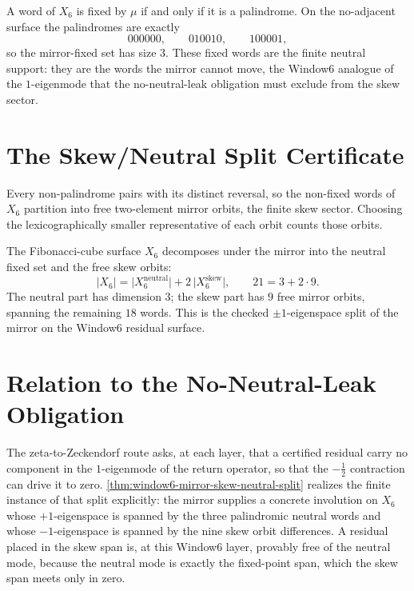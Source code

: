 \begin{theorem}
\label{thm:window6-mirror-fixed-palindrome}
A word of $X_6$ is fixed by $\mu$ if and only if it is a palindrome. On the no-adjacent surface the palindromes are exactly
$$
000000,\qquad 010010,\qquad 100001,
$$
so the mirror-fixed set has size $3$. These fixed words are the finite neutral support: they are the words the mirror cannot move, the Window6 analogue of the $1$-eigenmode that the no-neutral-leak obligation must exclude from the skew sector.
\end{theorem}

\section{The Skew/Neutral Split Certificate}
\label{sec:window6-mirror-skew-neutral-split}

Every non-palindrome pairs with its distinct reversal, so the non-fixed words of $X_6$ partition into free two-element mirror orbits, the finite skew sector. Choosing the lexicographically smaller representative of each orbit counts those orbits.

\begin{theorem}
\label{thm:window6-mirror-skew-neutral-split}
The Fibonacci-cube surface $X_6$ decomposes under the mirror into the neutral fixed set and the free skew orbits:
$$
\lvert X_6\rvert=\lvert X_6^{\mathrm{neutral}}\rvert+2\,\lvert X_6^{\mathrm{skew}}\rvert,
\qquad
21=3+2\cdot 9 .
$$
The neutral part has dimension $3$; the skew part has $9$ free mirror orbits, spanning the remaining $18$ words. This is the checked $\pm1$-eigenspace split of the mirror on the Window6 residual surface.
\end{theorem}

\section{Relation to the No-Neutral-Leak Obligation}
\label{sec:window6-mirror-rh-relation}

The zeta-to-Zeckendorf route asks, at each layer, that a certified residual carry no component in the $1$-eigenmode of the return operator, so that the $-\tfrac12$ contraction can drive it to zero. \autoref{thm:window6-mirror-skew-neutral-split} realizes the finite instance of that split explicitly: the mirror supplies a concrete involution on $X_6$ whose $+1$-eigenspace is spanned by the three palindromic neutral words and whose $-1$-eigenspace is spanned by the nine skew orbit differences. A residual placed in the skew span is, at this Window6 layer, provably free of the neutral mode, because the neutral mode is exactly the fixed-point span, which the skew span meets only in zero.

